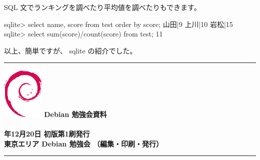 \documentclass[mingoth,a4paper]{jsarticle}
\newcommand{\debmtgyear}{2008}
\newcommand{\debmtgmonth}{12}
\newcommand{\debmtgdate}{20}
\begin{document}
SQL 文でランキングを調べたり平均値を調べたりもできます。

\begin{commandline}
sqlite> select name, score from test order by score; 
山田|9
上川|10
岩松|15
sqlite> select sum(score)/count(score) from test; 
11
\end{commandline}

以上、簡単ですが、 sqlite の紹介でした。


\clearpage


\cleartooddpage

\vspace*{15cm}
\hrule
\vspace{2mm}
\includegraphics[width=2cm]{image200502/openlogo-nd.eps}
\noindent \Large \bf Debian 勉強会資料\\ \\
\noindent \normalfont \debmtgyear{}年\debmtgmonth{}月\debmtgdate{}日 \hspace{5mm}  初版第1刷発行\\
\noindent \normalfont 東京エリア Debian 勉強会 （編集・印刷・発行）\\
\hrule
\end{document}
